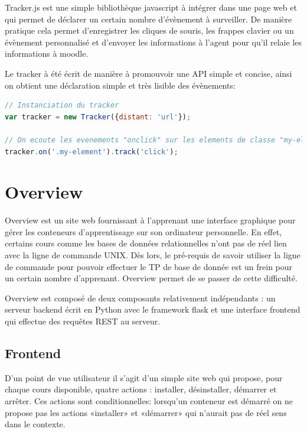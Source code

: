 \documentclass[a4paper,11pt]{report}
\begin{document}
Tracker.js est une simple bibliothèque javascript à intégrer dans une page web et qui permet de déclarer un certain nombre d'évènement à surveiller.
De manière pratique cela permet d'enregistrer les cliques de souris, les frappes clavier ou un évènement personnalisé et d'envoyer les informations à l'agent pour qu'il relaie les informations à moodle.

Le tracker à été écrit de manière à promouvoir une API simple et concise, ainsi on obtient une déclaration simple et très lisible des évènements:

\begin{lstlisting}[language=javascript, caption={Exemple d'utilisation de tracker.js}]
// Instanciation du tracker
var tracker = new Tracker({distant: 'url'});

// On ecoute les evenements "onclick" sur les elements de classe "my-element"
tracker.on('.my-element').track('click');
\end{lstlisting}

\section{Overview}

Overview est un site web fournissant à l'apprenant une interface graphique pour gérer les conteneurs d'apprentissage sur son ordinateur personnelle.
En effet, certains cours comme les bases de données relationnelles n'ont pas de réel lien avec la ligne de commande UNIX. Dès lors, le pré-requis de savoir utiliser la ligne de commande pour pouvoir effectuer le TP de base de donnée est un frein pour un certain nombre d'apprenant. Overview permet de se passer de cette difficulté.

Overview est composé de deux composants relativement indépendants : un serveur backend écrit en Python avec le framework flask et une interface frontend qui effectue des requêtes REST au serveur.

\subsection{Frontend}

D'un point de vue utilisateur il s'agit d'un simple site web qui propose, pour chaque cours disponible, quatre actions : installer, désinstaller, démarrer et arrêter. Ces actions sont conditionnelles: lorsqu'un conteneur est démarré on ne propose pas les actions «installer» et «démarrer» qui n'aurait pas de réel sens dans le contexte.
\end{document}
